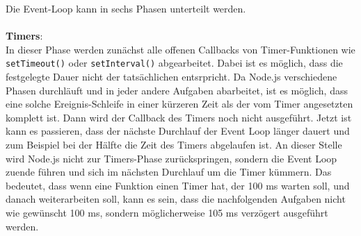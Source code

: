 Die Event-Loop kann in sechs Phasen unterteilt werden.\\ \\
\textbf{Timers}:\\
In dieser Phase werden zunächst alle offenen Callbacks von Timer-Funktionen wie \texttt{setTimeout()} oder \texttt{setInterval()} abgearbeitet. Dabei ist es möglich, dass die festgelegte Dauer nicht der tatsächlichen entsrpricht. Da Node.js verschiedene Phasen durchläuft und in jeder andere Aufgaben abarbeitet, ist es möglich, dass eine solche Ereignis-Schleife in einer kürzeren Zeit als der vom Timer angesetzten komplett ist. Dann wird der Callback des Timers noch nicht ausgeführt. Jetzt ist kann es passieren, dass der nächste Durchlauf der Event Loop länger dauert und zum Beispiel bei der Hälfte die Zeit des Timers abgelaufen ist. An dieser Stelle wird Node.js nicht zur Timers-Phase zurückspringen, sondern die Event Loop zuende führen und sich im nächsten Durchlauf um die Timer kümmern. Das bedeutet, dass wenn eine Funktion einen Timer hat, der 100 ms warten soll, und danach weiterarbeiten soll, kann es sein, dass die nachfolgenden Aufgaben nicht wie gewünscht 100 ms, sondern möglicherweise 105 ms verzögert ausgeführt werden. \\





